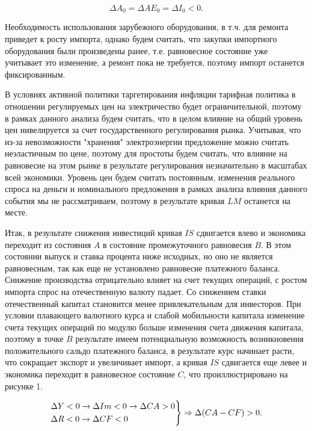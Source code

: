 \documentclass[12pt,a4paper, oneside]{extreport}
\begin{document}
\begin{equation}\label{key}
\Delta A_0 =  \Delta AE_0 = \Delta I_0  < 0.
\end{equation}

Необходимость использования зарубежного оборудования, в т.ч. для ремонта приведет к росту импорта, однако будем считать, что закупки импортного оборудования были произведены ранее, т.е. равновесное состояние уже учитывает это изменение, а ремонт пока не требуется, поэтому  импорт останется фиксированным. 

В условиях активной политики таргетирования инфляции тарифная политика в отношении регулируемых цен на электричество будет ограничительной, поэтому в рамках данного анализа будем считать, что в целом влияние на общий уровень цен нивелируется за счет государственного регулирования рынка. Учитывая, что из-за невозможности "хранения" электроэнергии предложение можно считать неэластичным по цене, поэтому для простоты будем считать, что влияние на равновесие на этом рынке в результате регулирования незначительно в масштабах всей экономики. Уровень цен будем считать постоянным, изменения реального спроса на деньги и номинального предложения в рамках  анализа влияния данного события мы не рассматриваем, поэтому в результате кривая $LM$ останется на месте.

Итак, в результате снижения инвестиций кривая $IS$ сдвигается  влево и экономика переходит из состояния $A$ в состояние промежуточного равновесия $B$.
В этом состоянии выпуск и ставка процента ниже исходных, но оно не является равновесным, так как еще не установлено равновесие платежного баланса.
Снижение производства отрицательно влияет на счет текущих операций, с ростом импорта  спрос на отечественную валюту падает. Со снижением ставки отечественный капитал становится менее привлекательным для инвесторов. 
При условии плавающего валютного курса и слабой мобильности капитала изменение счета текущих операций по модулю  больше изменения счета движения капитала, поэтому в точке $B$ результате имеем потенциальную  возможность возникновения положительного сальдо платежного баланса, в результате курс начинает расти, что сокращает экспорт и увеличивает импорт, а кривая $IS$ сдвигается еще левее и экономика переходит в равновесное состояние $C$, что проиллюстрировано на рисунке 1.

\begin{equation}\label{key}
\begin{rcases}
\Delta Y < 0 \rightarrow \Delta Im < 0 \rightarrow  \Delta CA > 0  \\
\Delta R < 0  \rightarrow \Delta CF < 0 
\end{rcases} \Rightarrow \Delta (CA-CF) >0.
\end{equation}
\end{document}
